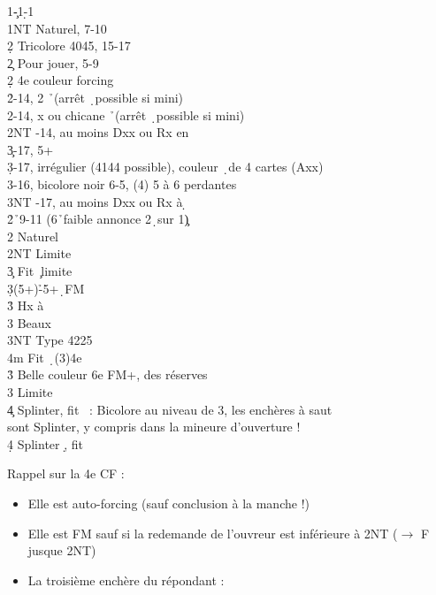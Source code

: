 \documentclass[a4paper]{article}
\begin{document}
\begin{bidtable}
1\c-1\d-1\s\+\\
1NT \> Naturel, 7-10\+\\
2\d \> Tricolore 4045, 15-17\-\\
2\c \> Pour jouer, 5-9\\
2\d \> 4e couleur forcing\+\\
2\h {}-14, 2 \h\ (arrêt \d\ possible si mini)\\
2\s {}-14, x ou chicane \h\ (arrêt \d\ possible si mini)\\
2NT -14, au moins Dxx ou Rx en \d \\
3\c {}-17, 5+\c \\
3\d {}-17, irrégulier (4144 possible), couleur \d\ de 4 cartes (Axx)\\
3\s {}-16, bicolore noir 6-5, (4) 5 à 6 perdantes\\
3NT -17, au moins Dxx ou Rx à \d \-\\
2\h {}\h\ 9-11 (6\h\ faible annonce 2\d\ sur 1\c )\\
2\s \> Naturel\\
2NT \> Limite\\
3\c \> Fit \c\ limite\\
3\d {}(5+)\h -5+\d\ FM\+\\
3\h \> Hx à \h \\
3\s \> Beaux \s \\
3NT \> Type 4225\\
4m \> Fit \d\ (3)4e\-\\
3\h \> Belle couleur 6e FM+, des réserves\\
3\s \> Limite\\
4\c \> Splinter, fit \s\ : Bicolore au niveau de 3, les enchères à saut\\
\>sont Splinter, y compris dans la mineure d'ouverture !\\
4\d \> Splinter \d , fit \s \-
\end{bidtable}

Rappel sur la 4e CF :

\begin{itemize}
\item Elle est auto-forcing (sauf conclusion à la manche !)

\item Elle est FM sauf si la redemande de l'ouvreur est inférieure à 2NT ($\rightarrow$ F jusque 2NT)

\item La troisième enchère du répondant :

\end{itemize}
\end{document}
